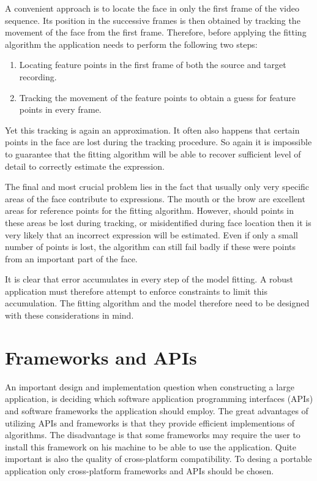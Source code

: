 \documentclass[11pt,a4paper]{report}
\begin{document}
A convenient approach is to locate the face in only the first frame of the video
sequence. Its position in the successive frames is then obtained by tracking the
movement of the face from the first frame. Therefore, before applying the
fitting algorithm the application needs to perform the following two steps:
\begin{enumerate}
\item Locating feature points in the first frame of both the source and target
  recording.
\item Tracking the movement of the feature points to obtain a guess for feature
  points in every frame.
\end{enumerate}

Yet this tracking is again an approximation. It often also happens that certain points in the face are lost
during the tracking procedure. So again it is impossible to guarantee that the
fitting algorithm will be able to recover sufficient level of detail to correctly estimate the expression.


The final and most crucial problem lies in the fact that usually only very specific
areas of the face contribute to expressions. The mouth or the brow are excellent
areas for reference points for the fitting algorithm. However, should points in these
areas be lost during tracking, or misidentified during face location then it is
very likely that an incorrect expression will be estimated. Even if only a small
number of points is lost, the algorithm can still fail badly if these were
points from an important part of the face.

It is clear that error accumulates in every step of the model
fitting. A robust application must therefore attempt to enforce constraints to limit this
accumulation. The fitting algorithm and the model therefore need to be designed
with these considerations in mind.

\section{Frameworks and APIs}
An important design and implementation question when constructing a large
application, is deciding which software application programming interfaces
(APIs) and software frameworks the application should employ. The
great advantages of utilizing APIs and frameworks is that they provide efficient
implementions of algorithms. The disadvantage is that some frameworks may
require the user to install this framework on his machine to be able to use the
application. Quite important is also the quality of cross-platform
compatibility. To desing a portable application only cross-platform
frameworks and APIs should be chosen.
\end{document}
